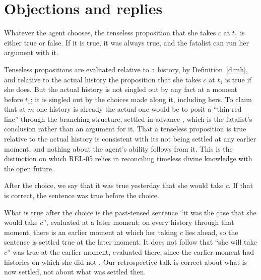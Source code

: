 \documentclass{situationist-preprint}
\begin{document}
\section{Objections and replies}

\begin{objection}
Whatever the agent chooses, the tenseless proposition that she takes $c$ at $t_1$ is either true or false. If it is true, it was always true, and the fatalist can run her argument with it.
\end{objection}

\begin{reply}
Tenseless propositions are evaluated relative to a history, by Definition~\ref{d:mh}, and relative to the actual history the proposition that she takes $c$ at $t_1$ is true if she does. But the actual history is not singled out by any fact at a moment before $t_1$; it is singled out by the choices made along it, including hers. To claim that at $m$ one history is already the actual one would be to posit a \enquote{thin red line} through the branching structure, settled in advance \citep{BelnapGreen1994}, which is the fatalist's conclusion rather than an argument for it. That a tenseless proposition is true relative to the actual history is consistent with its not being settled at any earlier moment, and nothing about the agent's ability follows from it. This is the distinction on which REL-05 relies in reconciling timeless divine knowledge with the open future.
\end{reply}

\begin{objection}
After the choice, we say that it was true yesterday that she would take $c$. If that is correct, the sentence was true before the choice.
\end{objection}

\begin{reply}
What is true after the choice is the past-tensed sentence \enquote{it was the case that she would take $c$}, evaluated at a later moment: on every history through that moment, there is an earlier moment at which her taking $c$ lies ahead, so the sentence is settled true at the later moment. It does not follow that \enquote{she will take $c$} was true at the earlier moment, evaluated there, since the earlier moment had histories on which she did not \citep{Thomason1970}. Our retrospective talk is correct about what is now settled, not about what was settled then.
\end{reply}
\end{document}
